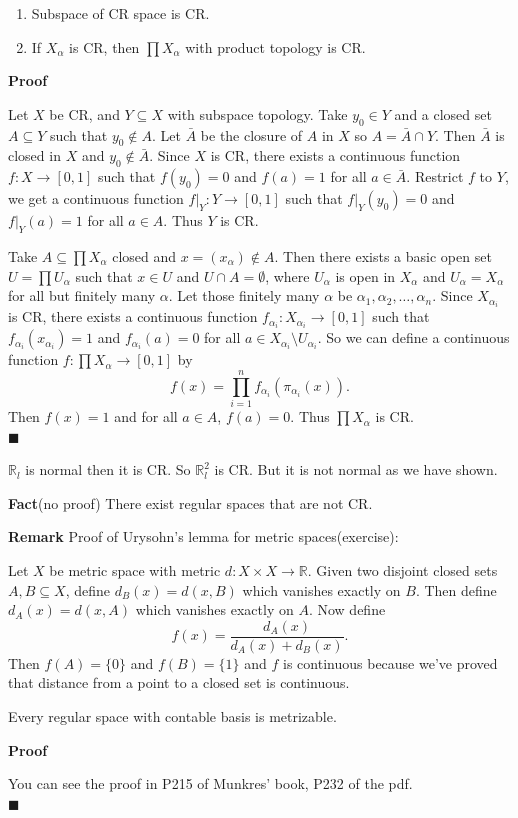 \documentclass[main.tex]{subfiles}
\begin{document}
\begin{theorem}
    \begin{enumerate}
        \item Subspace of CR space is CR. 
        \item If $X_{\alpha}$ is CR, then $\prod X_{\alpha}$ with product topology is CR. 
    \end{enumerate}
\end{theorem}
\par \noindent \textbf{Proof} 
\par Let $X$ be CR, and $Y \subseteq X$ with subspace topology. Take $y_0 \in Y$ and a closed set $A \subseteq Y$ such that $y_0 \notin A$. Let $\bar{A}$ be the closure of $A$ in $X$ so $A = \bar{A} \cap Y$. Then $\bar{A}$ is closed in $X$ and $y_0 \notin \bar{A}$. Since $X$ is CR, there exists a continuous function $f: X \to [0, 1]$ such that $f(y_0) = 0$ and $f(a) = 1$ for all $a \in \bar{A}$. Restrict $f$ to $Y$, we get a continuous function $f|_Y: Y \to [0, 1]$ such that $f|_Y(y_0) = 0$ and $f|_Y(a) = 1$ for all $a \in A$. Thus $Y$ is CR.
\par Take $A \subseteq \prod X_{\alpha}$ closed and $x = (x_{\alpha}) \notin A$. Then there exists a basic open set $U = \prod U_{\alpha}$ such that $x \in U$ and $U \cap A = \emptyset$, where $U_{\alpha}$ is open in $X_{\alpha}$ and $U_{\alpha} = X_{\alpha}$ for all but finitely many $\alpha$. Let those finitely many $\alpha$ be $\alpha_1, \alpha_2, \ldots, \alpha_n$. Since $X_{\alpha_i}$ is CR, there exists a continuous function $f_{\alpha_i}: X_{\alpha_i} \to [0, 1]$ such that $f_{\alpha_i}(x_{\alpha_i}) = 1$ and $f_{\alpha_i}(a) = 0$ for all $a \in X_{\alpha_i} \setminus U_{\alpha_i}$. So we can define a continuous function $f: \prod X_{\alpha} \to [0, 1]$ by
\[
    f(x) = \prod_{i = 1}^{n} f_{\alpha_i}(\pi_{\alpha_i}(x)). 
\]
Then $f(x) = 1$ and for all $a \in A$, $f(a) = 0$. Thus $\prod X_{\alpha}$ is CR.
\mbox{} \\ \null \hfill $\blacksquare$  

\begin{example}
    $\mathbb{R}_l$ is normal then it is CR. So $\mathbb{R}_l^2$ is CR. But it is not normal as we have shown. 
\end{example}

\par \noindent \textbf{Fact}(no proof) There exist regular spaces that are not CR. 

\par \noindent \textbf{Remark} Proof of Urysohn's lemma for metric spaces(exercise): 
\par Let $X$ be metric space with metric $d: X \times X \to \mathbb{R}$. Given two disjoint closed sets $A, B \subseteq X$, define $d_B(x) = d(x, B)$ which vanishes exactly on $B$. Then define $d_A(x) = d(x, A)$ which vanishes exactly on $A$. Now define 
\[
    f(x) = \frac{d_A(x)}{d_A(x) + d_B(x)}.
\]
Then $f(A) = \{0\}$ and $f(B) = \{1\}$ and $f$ is continuous because we've proved that distance from a point to a closed set is continuous.   

\begin{theorem}
    Every regular space with contable basis is metrizable. 
\end{theorem}
\par \noindent \textbf{Proof} 
\par You can see the proof in P215 of Munkres' book, P232 of the pdf. 
\mbox{} \\ \null \hfill $\blacksquare$ 
\end{document}
